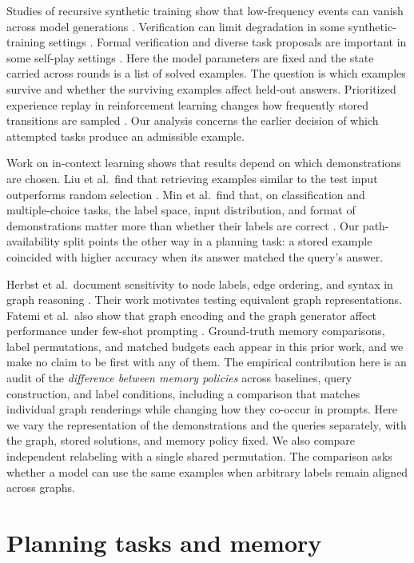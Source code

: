 \documentclass[11pt]{article}
\begin{document}
Studies of recursive synthetic training show that low-frequency events can
vanish across model generations \cite{shumailov2024}. Verification can
limit degradation in some synthetic-training settings \cite{feng2024}.
Formal verification
and diverse task proposals are important in some self-play settings
\cite{psv}. Here the model parameters are fixed and the state carried
across rounds is a list of solved examples. The question is which examples
survive and whether the surviving examples affect held-out answers.
Prioritized experience replay in reinforcement learning changes how
frequently stored transitions are sampled \cite{prioritizedreplay}.
Our analysis concerns the earlier decision of which attempted tasks
produce an admissible example.

Work on in-context learning shows that results depend on which
demonstrations are chosen. Liu et al.\ find that retrieving examples
similar to the test input outperforms random selection
\cite{goodexamples}. Min et al.\ find that, on classification and
multiple-choice tasks, the label space, input distribution, and format
of demonstrations matter more than whether their labels are correct
\cite{roledemonstrations}. Our path-availability split points the
other way in a planning task: a stored example coincided with higher
accuracy when its answer matched the query's answer.

Herbst et al.\ document sensitivity to node labels, edge ordering, and
syntax in graph reasoning \cite{lostserialization}. Their work motivates
testing equivalent graph representations. Fatemi et al.\ also show that
graph encoding and the graph generator affect performance under few-shot
prompting \cite{fatemi_graph}. Ground-truth memory comparisons, label
permutations, and matched budgets each appear in this prior work, and we
make no claim to be first with any of them. The empirical contribution
here is an audit of the \emph{difference between memory policies}
across baselines, query construction, and label conditions, including a
comparison that matches individual graph renderings while changing how
they co-occur in prompts. Here we vary the representation
of the demonstrations and the queries separately, with the graph, stored
solutions, and memory policy fixed. We also compare independent relabeling
with a single shared permutation. The comparison asks whether a model can
use the same examples when arbitrary labels remain aligned across graphs.

\section{Planning tasks and memory}
\end{document}

